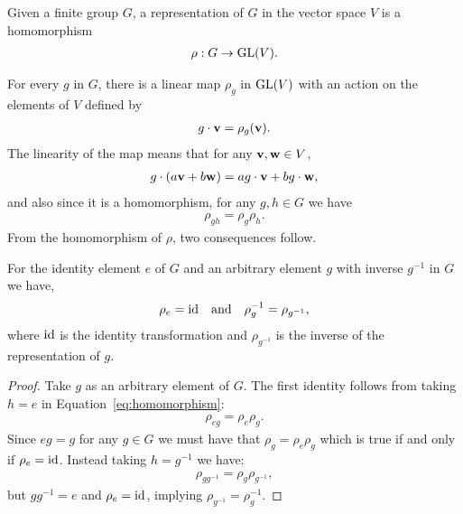 \begin{definition}[Representation]\cite{Serre}
	Given a finite group $G$, a representation of $G$ in the vector space $V$ is a homomorphism
	\begin{align}\label{eq:DefRepr}
		\rho: G \rightarrow \text{GL}(V).
	\end{align}
\end{definition}
For every $g$ in $G$, there is a linear map $\rho_g$ in $\text{GL}(V)$ with an action on the elements of $V$ defined by 
\begin{align*}
	g \cdot \mathbf{v} = \rho_g (\mathbf{v}).
\end{align*}
The linearity of the map means that for any $\mathbf{v}, \mathbf{w} \in V$,
\begin{align}\label{eq:linearityOfg}
	g \cdot (a\mathbf{v} + b\mathbf{w}) = ag\cdot\mathbf{v} + bg\cdot\mathbf{w},
\end{align} 
and also since it is a homomorphism, for any $g,h \in G$ we have
\begin{align}\label{eq:homomorphism}
	\rho_{gh} = \rho_g \rho_h.
\end{align}
From the homomorphism of $\rho$, two consequences follow.
\begin{proposition}
	For the identity element $e$ of $G$ and an arbitrary element $g$ with inverse $g^{-1}$ in $G$ we have,
	\begin{align}\label{eq:rhoIdAndInv}
		\rho_e = \text{id} \quad \text{and} \quad \rho_g^{-1} = \rho_{g^{-1}},
	\end{align}
	where $\text{id}$ is the identity transformation and $\rho_{g^{-1}}$ is the inverse of the representation of $g$.
\end{proposition}
\begin{proof}
	Take $g$ as an arbitrary element of $G$. The first identity follows from taking $h=e$ in Equation~\ref{eq:homomorphism}:
	\begin{align*}
		\rho_{eg} = \rho_e \rho_g.
	\end{align*}
	Since $eg=g$ for any $g\in G$ we must have that $\rho_g = \rho_e\rho_g$ which is true if and only if $\rho_e = \text{id}$. Instead taking $h=g^{-1}$ we have:
	\begin{align*}
		\rho_{gg^{-1}} = \rho_g \rho_{g^{-1}},
	\end{align*}
	but $gg^{-1} = e$ and $\rho_e = \text{id}$, implying $\rho_{g^{-1}} = \rho_g^{-1}$.
\end{proof}

